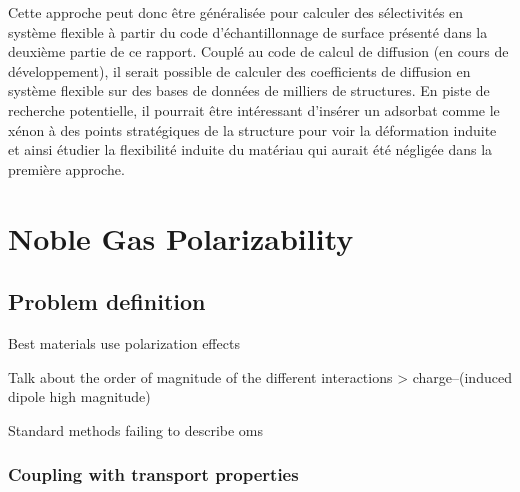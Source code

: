 \documentclass[main]{subfiles}
\begin{document}
Cette approche peut donc être généralisée pour calculer des sélectivités en système flexible à partir du code d'échantillonnage de surface présenté dans la deuxième partie de ce rapport. Couplé au code de calcul de diffusion (en cours de développement), il serait possible de calculer des coefficients de diffusion en système flexible sur des bases de données de milliers de structures. En piste de recherche potentielle, il pourrait être intéressant d'insérer un adsorbat comme le xénon à des points stratégiques de la structure pour voir la déformation induite et ainsi étudier la flexibilité induite du matériau qui aurait été négligée dans la première approche. 


\section{Noble Gas Polarizability}

\subsection{Problem definition}

Best materials use polarization effects \autocite{Li_2019,Pei_2022}

Talk about the order of magnitude of the different interactions > charge--(induced dipole high magnitude)

Standard methods failing to describe oms\autocite{Perry_2014} 


\subsubsection{Coupling with transport properties}

\end{document}

